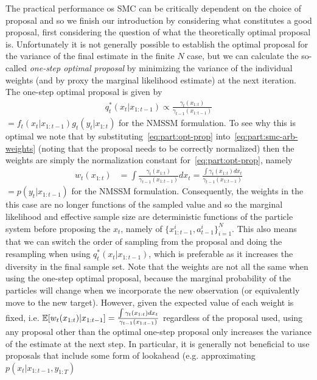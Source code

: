 The practical performance os SMC can be critically dependent on the choice of proposal and
so we finish our introduction by considering what constitutes a good proposal, first
considering the question of what the theoretically optimal proposal is. Unfortunately it is not generally
possible to establish the optimal proposal for the variance of the final estimate in the finite $N$ case, but we can
calculate the so-called \emph{one-step optimal proposal} by minimizing the variance of the individual weights (and
by proxy the marginal likelihood estimate) at the next iteration.  The one-step optimal proposal is given by
\begin{align}
\label{eq:part:opt-prop}
q_t^*(x_t | x_{1:t-1}) \propto \frac{\gamma_t({x}_{1:t})}{\gamma_{t - 1}({x}_{1:t - 1})} 
\end{align}
$= f_t(x_t | x_{1:t-1}) g_t(y_t | x_{1:t})$ for the NMSSM formulation.  To see why this is optimal we note that
by substituting~\eqref{eq:part:opt-prop} into~\eqref{eq:part:smc-arb-weights} (noting that the proposal needs
to be correctly normalized) then the weights are simply the normalization constant for~\eqref{eq:part:opt-prop}, namely
\begin{align}
w_t(x_{1:t}) &= \int \frac{\gamma_t({x}_{1:t})}{\gamma_{t - 1}({x}_{1:t - 1})} dx_t = 
\frac{\int\gamma_t({x}_{1:t}) dx_t}{\gamma_{t - 1}({x}_{1:t - 1})} 
\end{align}
$=p(y_t | x_{1:t-1})$ for the NMSSM formulation.  Consequently, the weights in the this case are no longer
functions of the sampled value and so the marginal likelihood and effective sample size are deterministic
functions of the particle system before proposing the $x_{t}$, namely of $\{x_{1:t-1}^i,a_{t-1}^i\}_{i=1}^N$.
This also means that we can switch the order of sampling from the proposal and doing the resampling when
using $q_t^*(x_t | x_{1:t-1})$, which is preferable as it increases the diversity in the final sample set.
Note that the weights are not all the same when using the one-step optimal proposal, because
the marginal probability of the particles will change when we incorporate the new observation (or equivalently
move to the new target).  However, given the expected value of each weight is fixed, i.e. $\mathbb{E} [w_t(x_{1:t}) | x_{1:t-1}]=
\frac{\int  \gamma_t({x}_{1:t}) dx_t}{\gamma_{t - 1}({x}_{1:t - 1})} $ regardless of the proposal
used, using any proposal other than the optimal one-step proposal only increases the variance of the estimate
at the next step.  In particular, it is generally
not beneficial to use proposals that include some form of lookahead (e.g. approximating $p(x_{t} |x_{1:t-1},y_{1:T})$
